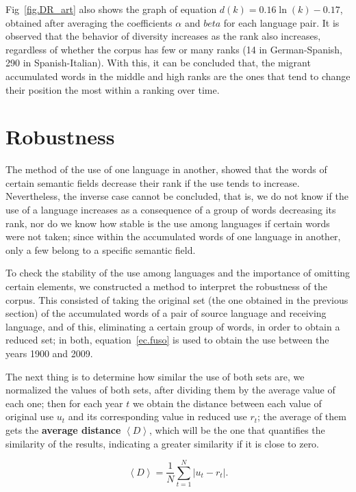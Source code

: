\documentclass[10pt,letterpaper]{article} %
\begin{document}
Fig~\ref{fig.DR_art} also shows the graph of equation $d(k) = 0.16\ln(k) - 0.17$, obtained after averaging the coefficients $\alpha$ and $beta$ for each language pair. It is observed that the behavior of diversity increases as the rank also increases, regardless of whether the corpus has few or many ranks (14 in German-Spanish, 290 in Spanish-Italian). With this, it can be concluded that, the migrant accumulated words in the middle and high ranks are the ones that tend to change their position the most within a ranking over time.



\section*{Robustness} %

The method of the use of one language in another, showed that the words of certain semantic fields decrease their rank if the use tends to increase. Nevertheless, the inverse case cannot be concluded, that is, we do not know if the use of a language increases as a consequence of a group of words decreasing its rank, nor do we know how stable is the use among languages if certain words were not taken; since within the accumulated words of one language in another, only a few belong to a specific semantic field.

To check the stability of the use among languages and the importance of omitting certain elements, we constructed a method to interpret the robustness of the corpus. This consisted of taking the original set (the one obtained in the previous section) of the accumulated words of a pair of source language and receiving language, and of this, eliminating a certain group of words, in order to obtain a reduced set; in both,  equation~\ref{ec.fuso} is used to obtain the use between the years 1900 and 2009.

The next thing is to determine how similar the use of both sets are, we normalized the values of both sets, after dividing them by the average value of each one; then for each year $t$ we obtain the distance between each value of original use $u_{t}$ and its corresponding value in reduced use $r_{t}$; the average of them gets the \textbf{average distance} $\left\langle D \right\rangle$, which will be the one that quantifies the similarity of the results, indicating a greater similarity if it is close to zero.

\begin{equation}
\left\langle D \right\rangle  = \frac{1}{N}\sum_{t=1}^{N} \left| u_{t} - r_{t} \right|  .
\label{ec.Davg}
\end{equation}
\end{document}
